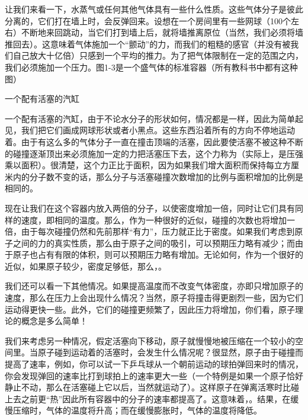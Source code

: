 \documentclass[12pt,oneside]{book}
\begin{document}
\begin{common-format}
让我们来看一下，水蒸气或任何其他气体具有一些什么性质。这些气体分子是彼此分离的，它们打在墙上时，会反弹回来。设想在一个房间里有一些网球（100个左右）不断地来回跳动，当它们打到墙上后，就将墙推离原位（当然，我们必须将墙推回去）。这意味着气体施加一个“颤动”的力，而我们的粗糙的感官（并没有被我们自己放大十亿倍）只感到一个平均的推力。为了把气体限制在一定的范围之内，我们必须施加一个压力。图1-3是一个盛气体的标准容器（所有教科书中都有这种图）
\begin{fig}{一个配有活塞的汽缸}
\caption{一个配有活塞的汽缸}
\label{fig:一个配有活塞的汽缸}
\end{fig}
一个配有活塞的汽缸，由于不论水分子的形状如何，情况都是一样，因此为简单起见，我们把它们画成网球形状或者小黑点。这些东西沿着所有的方向不停地运动着。由于有这么多的气体分子一直在撞击顶端的活塞，因此要使活塞不被这种不断的碰撞逐渐顶出来必须施加一定的力把活塞压下去，这个力称为（实际上，是压强乘以面积）。很清楚，这个力正比于面积，因为如果我们增大面积而保持每立方厘米内的分子数不变的话，那么分子与活塞碰撞次数增加的比例与面积增加的比例是相同的。

现在让我们在这个容器内放入两倍的分子，以使密度增加一倍，同时让它们具有同样的速度，即相同的温度。那么，作为一种很好的近似，碰撞的次数也将增加一倍，由于每次碰撞仍然和先前那样“有力”，压力就正比于密度。如果我们考虑到原子之间的力的真实性质，那么由于原子之间的吸引，可以预期压力略有减少；而由于原子也占有有限的体积，则可以预期压力略有增加。无论如何，作为一个很好的近似，如果原子较少，密度足够低，那么，。

我们还可以看一下其他情况。如果提高温度而不改变气体密度，亦即只增加原子的速度，那么在压力上会出现什么情况？当然，原子将撞击得更剧烈一些，因为它们运动得更快一些。此外，它们的碰撞更频繁了，因此压力将增加，你们看，原子理论的概念是多么简单！

我们来考虑另一种情况，假定活塞向下移动，原子就慢慢地被压缩在一个较小的空间里。当原子碰到运动着的活塞时，会发生什么情况呢？很显然，原子由于碰撞而提高了速率，例如，你可以试一下乒乓球从一个朝前运动的球拍弹回来时的情况，你会发现弹回的速率比打到球拍上的速率更大一些（一个特例是如果一个原子恰好静止不动，那么在活塞碰上它以后，当然就运动了）。这样原子在弹离活寒时比碰上去之前更“热”因此所有容器中的分子的速率都提高了。这意味着，。结果，在缓慢压缩时，气体的温度将升高；而在缓慢膨胀时，气体的温度将降低。


\end{common-format}
\end{document}
